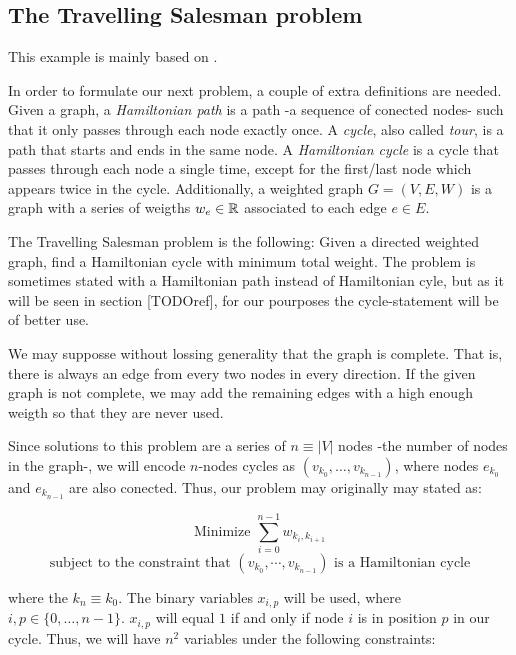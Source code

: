 \subsection{The Travelling Salesman problem}


This example is mainly based on \cite{Glover2019}.

In order to formulate our next problem, a couple of extra definitions are needed. Given a graph, a \emph{Hamiltonian path} is a path -a sequence of conected nodes- such that it only passes through each node exactly once. A \emph{cycle}, also called \emph{tour}, is a path that starts and ends in the same node. A \emph{Hamiltonian cycle} is a cycle that passes through each node a single time, except for the first/last node which appears twice in the cycle. Additionally, a weighted graph $G =(V, E, W)$ is a graph with a series of weigths $w_e \in \mathbb{R}$ associated to each edge $e \in E$.

The Travelling Salesman problem is the following: Given a directed weighted graph, find a Hamiltonian cycle with minimum total weight. The problem is sometimes stated with a Hamiltonian path instead of Hamiltonian cyle, but as it will be seen in section [TODOref], for our pourposes the cycle-statement will be of better use.

We may supposse without lossing generality that the graph is complete. That is, there is always an edge from every two nodes in every direction. If the given graph is not complete, we may add the remaining edges with a high enough weigth so that they are never used.

Since solutions to this problem are a series of $n \equiv |V|$ nodes -the number of nodes in the graph-, we will encode $n$-nodes cycles as $(v_{k_0}, \ldots, v_{k_{n-1}})$, where nodes $e_{k_0}$ and $e_{k_{n-1}}$ are also conected. Thus, our problem may originally may stated as:

$$ \text{Minimize } \sum_{i=0}^{n-1} w_{k_i, k_{i+1}} $$
$$ \text{subject to the constraint that } (v_{k_0}, \cdots, v_{k_{n-1}}) \text{ is a Hamiltonian cycle}$$

where the $k_n \equiv k_0$. The binary variables $x_{i,p}$ will be used, where $i,p \in \{0, \ldots, n-1\}$. $x_{i,p}$ will equal $1$ if and only if node $i$ is in position $p$ in our cycle. Thus, we will have $n^2$ variables under the following constraints:

